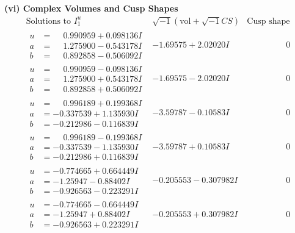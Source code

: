 \documentclass[1p]{elsarticle_modified}
\theoremstyle{definition}
\newcommand{\I}{\sqrt{-1}}
\begin{document}
\newpage\flushleft \textbf{(vi) Complex Volumes and Cusp Shapes}
$$\begin{array}{c|c|c}  
\text{Solutions to }I^u_{1}& \I (\text{vol} + \sqrt{-1}CS) & \text{Cusp shape}\\
 \hline 
\begin{aligned}
u &= \phantom{-}0.990959 + 0.098136 I \\
a &= \phantom{-}1.275900 - 0.543178 I \\
b &= \phantom{-}0.892858 - 0.506092 I\end{aligned}
 & -1.69575 + 2.02020 I & \phantom{-0.000000 } 0 \\ \hline\begin{aligned}
u &= \phantom{-}0.990959 - 0.098136 I \\
a &= \phantom{-}1.275900 + 0.543178 I \\
b &= \phantom{-}0.892858 + 0.506092 I\end{aligned}
 & -1.69575 - 2.02020 I & \phantom{-0.000000 } 0 \\ \hline\begin{aligned}
u &= \phantom{-}0.996189 + 0.199368 I \\
a &= -0.337539 + 1.135930 I \\
b &= -0.212986 - 0.116839 I\end{aligned}
 & -3.59787 - 0.10583 I & \phantom{-0.000000 } 0 \\ \hline\begin{aligned}
u &= \phantom{-}0.996189 - 0.199368 I \\
a &= -0.337539 - 1.135930 I \\
b &= -0.212986 + 0.116839 I\end{aligned}
 & -3.59787 + 0.10583 I & \phantom{-0.000000 } 0 \\ \hline\begin{aligned}
u &= -0.774665 + 0.664449 I \\
a &= -1.25947 - 0.88402 I \\
b &= -0.926563 - 0.223291 I\end{aligned}
 & -0.205553 - 0.307982 I & \phantom{-0.000000 } 0 \\ \hline\begin{aligned}
u &= -0.774665 - 0.664449 I \\
a &= -1.25947 + 0.88402 I \\
b &= -0.926563 + 0.223291 I\end{aligned}
 & -0.205553 + 0.307982 I & \phantom{-0.000000 } 0 \\ \hline\begin{aligned}

\end{aligned}
\end{array}$$
\end{document}
